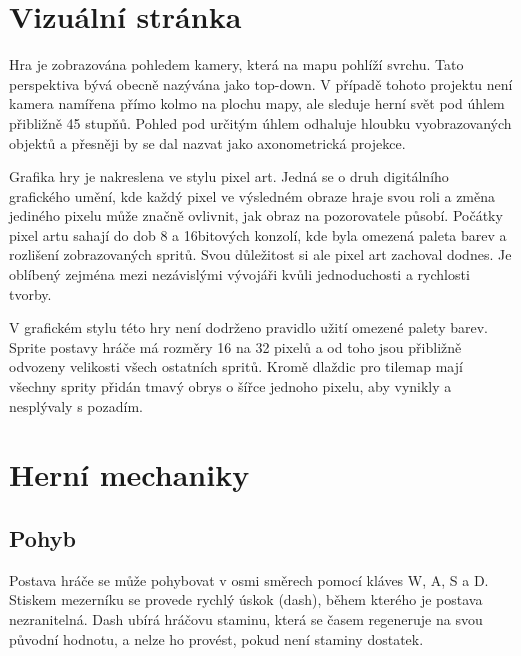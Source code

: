 \documentclass[FM,Proj]{tulthesis}
\begin{document}
	\section{Vizuální stránka}
	
	Hra je zobrazována pohledem kamery, která na mapu pohlíží svrchu. Tato perspektiva bývá obecně nazývána jako top-down. V případě tohoto projektu není kamera namířena přímo kolmo na plochu mapy, ale sleduje herní svět pod úhlem přibližně 45 stupňů. Pohled pod určitým úhlem odhaluje hloubku vyobrazovaných objektů a přesněji by se dal nazvat jako axonometrická projekce.
	\cite{MatejJan}
	
	Grafika hry je nakreslena ve stylu pixel art. Jedná se o druh digitálního grafického umění, kde každý pixel ve výsledném obraze hraje svou roli a změna jediného pixelu může značně ovlivnit, jak obraz na pozorovatele působí. Počátky pixel artu sahají do dob 8 a 16bitových konzolí, kde byla omezená paleta barev a rozlišení zobrazovaných spritů. Svou důležitost si ale pixel art zachoval dodnes. Je oblíbený zejména mezi nezávislými vývojáři kvůli jednoduchosti a rychlosti tvorby.
	\cite{pixelArt}
	
	V grafickém stylu této hry není dodrženo pravidlo užití omezené palety barev. Sprite postavy hráče má rozměry 16 na 32 pixelů a od toho jsou přibližně odvozeny velikosti všech ostatních spritů. Kromě dlaždic pro tilemap mají všechny sprity přidán tmavý obrys o šířce jednoho pixelu, aby vynikly a nesplývaly s pozadím.
	
	
	\section{Herní mechaniky}
	
	\subsection{Pohyb} %
	
	Postava hráče se může pohybovat v osmi směrech pomocí kláves W, A, S a D. Stiskem mezerníku se provede rychlý úskok (dash), během kterého je postava nezranitelná. Dash ubírá hráčovu staminu, která se časem regeneruje na svou původní hodnotu, a nelze ho provést, pokud není staminy dostatek.
	
\end{document}
